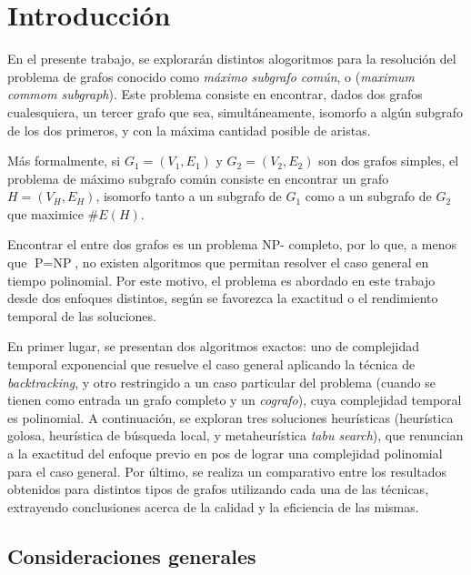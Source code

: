 \section*{Introducción}

En el presente trabajo, se explorarán distintos alogoritmos para la resolución
del problema de grafos conocido como \emph{máximo subgrafo común}, o
 (\emph{maximum commom subgraph}). Este problema consiste en
encontrar, dados dos grafos cualesquiera, un tercer grafo que sea,
simultáneamente, isomorfo a algún subgrafo de los dos primeros, y con la
máxima cantidad posible de aristas.

Más formalmente, si $G_1 = (V_1, E_1)$ y $G_2 = (V_2, E_2)$ son dos grafos
simples, el problema de máximo subgrafo común consiste en encontrar un grafo
$H = (V_H, E_H)$, isomorfo tanto a un subgrafo de $G_1$ como a un subgrafo
de $G_2$ que maximice $\#E(H)$.

Encontrar el  entre dos grafos es un problema NP-
completo\cite{garey}, por lo que, a menos que $\text{P} = \text{NP}$, no
existen algoritmos que permitan resolver el caso general en tiempo polinomial.
Por este motivo, el problema es abordado en este trabajo desde dos enfoques
distintos, según se favorezca la exactitud o el rendimiento temporal de las
soluciones.

En primer lugar, se presentan dos algoritmos exactos: uno de complejidad
temporal exponencial que resuelve el caso general aplicando la técnica de
\emph{backtracking}, y otro restringido a un caso particular del problema
(cuando se tienen como entrada un grafo completo y un \emph {cografo}), cuya
complejidad temporal es polinomial. A continuación, se exploran tres
soluciones heurísticas (heurística golosa, heurística de búsqueda local, y
metaheurística \emph{tabu search}), que renuncian a la exactitud del enfoque
previo en pos de lograr una complejidad polinomial para el caso general. Por
último, se realiza un comparativo entre los resultados obtenidos para
distintos tipos de grafos utilizando cada una de las técnicas, extrayendo
conclusiones acerca de la calidad y la eficiencia de las mismas.

\subsection*{Consideraciones generales}

